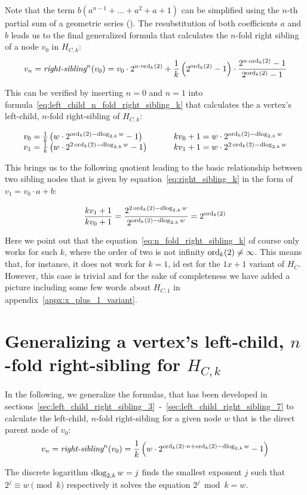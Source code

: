 Note that the term $b(a^{n-1}+\ldots+a^2+a+1)$ can be simplified using the $n$-th partial sum of a geometric series (\cite[p.~192]{Ref_Teschl_2013}). The resubstitution of both coefficients $a$ and $b$ leads us to the final generalized formula that calculates the $n$-fold right sibling of a node $v_0$ in $H_{C,k}$:
\begin{equation}
\label{eq:n_fold_right_sibling_k}
v_n=\textit{right-sibling}^n(v_0)=v_0\cdot2^{n\cdot\operatorname{ord}_k(2)}+\frac{1}{k}\left(2^{\operatorname{ord}_k(2)}-1\right)\cdot\frac{2^{n\cdot\operatorname{ord}_k(2)}-1}{2^{\operatorname{ord}_k(2)}-1}
\end{equation}

This can be verified by inserting $n=0$ and $n=1$ into formula~\ref{eq:left_child_n_fold_right_sibling_k} that calculates the a vertex's left-child, $n$-fold right-sibling of $H_{C,k}$:

\[\arraycolsep=1.6em
\begin{array}{ll}
v_0=\frac{1}{k}\left(w\cdot2^{\ord_k(2)-\dlog_{2,k}w}-1\right) & kv_0+1=w\cdot2^{\ord_k(2)-\dlog_{2,k}w}\\
v_1=\frac{1}{k}\left(w\cdot2^{2\ord_k(2)-\dlog_{2,k}w}-1\right) & kv_1+1=w\cdot2^{2\ord_k(2)-\dlog_{2,k}w}
\end{array}
\]

This brings us to the following quotient leading to the basic relationship between two sibling nodes that is given by equation~\ref{eq:right_sibling_k} in the form of $v_1=v_0\cdot a+b$:

\[
\frac{kv_1+1}{kv_0+1}=\frac{2^{2\operatorname{ord}_k(2)-\operatorname{dlog}_{2,k}w}}{2^{\operatorname{ord}_k(2)-\operatorname{dlog}_{2,k}w}}=2^{\operatorname{ord}_k(2)}
\]

Here we point out that the equation~\ref{eq:n_fold_right_sibling_k} of course only works for such $k$, where the order of two is not infinity $\operatorname{ord}_k(2)\ne\infty$. This means that, for instance, it does not work for $k=1$, id est for the $1x+1$ variant of $H_C$. However, this case is trivial and for the sake of completeness we have added a picture including some few words about $H_{C,1}$ in appendix~\ref{appx:x_plus_1_variant}.

\section{\texorpdfstring{Generalizing a vertex's left-child, $n$-fold right-sibling for $H_{C,k}$}{Generalizing vertex's left-child, n-fold right-sibling for HCk}}
In the following, we generalize the formulas, that has been developed in sections~\ref{sec:left_child_right_sibling_3}~-~\ref{sec:left_child_right_sibling_7} to calculate the left-child, $n$-fold right-sibling for a given node $w$ that is the direct parent node of $v_0$:
\begin{equation}
\label{eq:left_child_n_fold_right_sibling_k}
v_n=\textit{right-sibling}^n(v_0)=\frac{1}{k}\left(w\cdot2^{\operatorname{ord}_k(2)\cdot n+\operatorname{ord}_k(2)-\operatorname{dlog}_{2,k}w}-1\right)
\end{equation}

The discrete logarithm $\operatorname{dlog}_{2,k}w=j$ finds the smallest exponent $j$ such that $2^j\equiv w\pmod k$ respectively it solves the equation $2^j\bmod k=w$.
